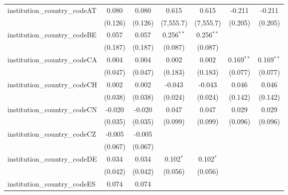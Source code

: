 \begin{tabular}{lcccccc}
   institution\_country\_codeAT          & 0.080          & 0.080          & 0.615         & 0.615         & -0.211         & -0.211\\   
                                         & (0.126)        & (0.126)        & (7,555.7)     & (7,555.7)     & (0.205)        & (0.205)\\   
   institution\_country\_codeBE          & 0.057          & 0.057          & 0.256$^{**}$  & 0.256$^{**}$  &                &   \\   
                                         & (0.187)        & (0.187)        & (0.087)       & (0.087)       &                &   \\   
   institution\_country\_codeCA          & 0.004          & 0.004          & 0.002         & 0.002         & 0.169$^{**}$   & 0.169$^{**}$\\   
                                         & (0.047)        & (0.047)        & (0.183)       & (0.183)       & (0.077)        & (0.077)\\   
   institution\_country\_codeCH          & 0.002          & 0.002          & -0.043        & -0.043        & 0.046          & 0.046\\   
                                         & (0.038)        & (0.038)        & (0.024)       & (0.024)       & (0.142)        & (0.142)\\   
   institution\_country\_codeCN          & -0.020         & -0.020         & 0.047         & 0.047         & 0.029          & 0.029\\   
                                         & (0.035)        & (0.035)        & (0.099)       & (0.099)       & (0.096)        & (0.096)\\   
   institution\_country\_codeCZ          & -0.005         & -0.005         &               &               &                &   \\   
                                         & (0.067)        & (0.067)        &               &               &                &   \\   
   institution\_country\_codeDE          & 0.034          & 0.034          & 0.102$^{*}$   & 0.102$^{*}$   &                &   \\   
                                         & (0.042)        & (0.042)        & (0.056)       & (0.056)       &                &   \\   
   institution\_country\_codeES          & 0.074          & 0.074          &               &               &                &   \\   

\end{tabular}
